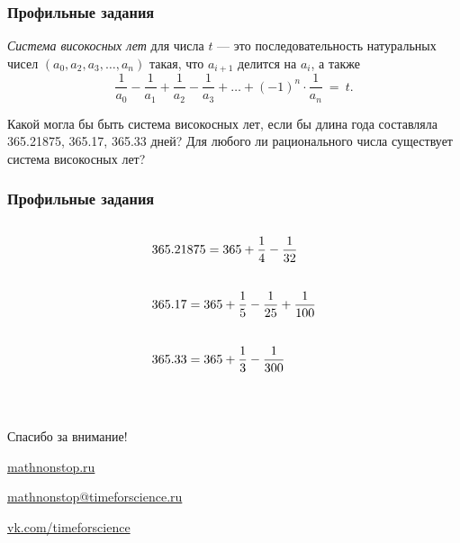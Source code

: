 \documentclass[aspectratio=1610,12pt,notheorems]{beamer}
\begin{document}
\begin{frame} \frametitle{Профильные задания}
{\it Система високосных лет} для числа $t$ — это последовательность натуральных чисел $(a_0, a_2, a_3, \ldots, a_n)$ такая, что $a_{i+1}$ делится на $a_i$, а также
	$$\frac{1}{a_0} - \frac{1}{a_1} + \frac{1}{a_2} - \frac{1}{a_3} + \ldots
	     + (-1)^{n} \cdot \frac{1}{a_n}\ =\ t.$$ \smallskip

Какой могла бы быть система високосных лет, если бы длина года составляла 365.21875, 365.17, 365.33 дней? Для любого ли рационального числа существует система високосных лет?
\end{frame}

\begin{frame} \frametitle{Профильные задания}

\begin{align*}
	& 365.21875 = 365 + \frac{1}{4} - \frac{1}{32}
		\vphantom{\int\limits_{0_0}^{0^0}} \\
	& 365.17 = 365 + \frac{1}{5} - \frac{1}{25} + \frac{1}{100}
		\vphantom{\int\limits_{0_0}^{0^0}} \\
	& 365.33 = 365 + \frac{1}{3} - \frac{1}{300}
		\vphantom{\int\limits_{0_0}^{0^0}} \\
\end{align*}

\end{frame}

\begin{frame} \begin{center}
\ 

	{\Large Спасибо за внимание!} \vspace{0.4cm}

	{\large \url{mathnonstop.ru}}

	{\large \url{mathnonstop@timeforscience.ru}}

	{\large \url{vk.com/timeforscience}}
\end{center} \end{frame}
\end{document}
